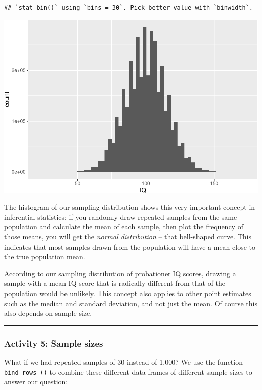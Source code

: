 \documentclass[
]{book}
\begin{document}
\begin{verbatim}
## `stat_bin()` using `bins = 30`. Pick better value with `binwidth`.
\end{verbatim}

\includegraphics{05-inferential-statistics_files/figure-latex/unnamed-chunk-8-1.pdf}

The histogram of our sampling distribution shows this very important concept in inferential statistics: if you randomly draw repeated samples from the same population and calculate the mean of each sample, then plot the frequency of those means, you will get the \emph{normal distribution} -- that bell-shaped curve. This indicates that most samples drawn from the population will have a mean close to the true population mean.

According to our sampling distribution of probationer IQ scores, drawing a sample with a mean IQ score that is radically different from that of the population would be unlikely. This concept also applies to other point estimates such as the median and standard deviation, and not just the mean. Of course this also depends on sample size.

\begin{center}\rule{0.5\linewidth}{0.5pt}\end{center}

\hypertarget{activity-5-sample-sizes}{%
\subsubsection{Activity 5: Sample sizes}\label{activity-5-sample-sizes}}

What if we had repeated samples of 30 instead of 1,000? We use the function \texttt{bind\_rows\ ()} to combine these different data frames of different sample sizes to answer our question:
\end{document}

